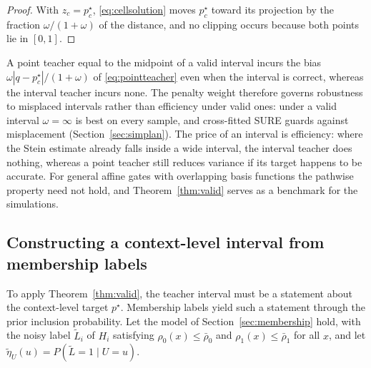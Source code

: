 \documentclass[11pt]{article}
\theoremstyle{plain}
\theoremstyle{definition}
\theoremstyle{remark}
\begin{document}
\begin{proof}
With $z_c=p_c^\star$, \eqref{eq:cellsolution} moves $p_c^\star$ toward its projection by the
fraction $\omega/(1+\omega)$ of the distance, and no clipping occurs because both points
lie in $[0,1]$.
\end{proof}

A point teacher equal to the midpoint of a valid interval incurs the bias
$\omega|q-p^\star_c|/(1+\omega)$ of \eqref{eq:pointteacher} even when the interval is
correct, whereas the interval teacher incurs none. The penalty weight therefore governs
robustness to misplaced intervals rather than efficiency under valid ones: under a valid
interval $\omega=\infty$ is best on every sample, and cross-fitted SURE guards against
misplacement (Section~\ref{sec:simplan}). The price of an interval is efficiency: where the
Stein estimate already falls inside a wide interval, the interval teacher does nothing, whereas
a point teacher still reduces variance if its target happens to be accurate. For general affine gates with overlapping
basis functions the pathwise property need not hold, and Theorem~\ref{thm:valid} serves as
a benchmark for the simulations.

\subsection{Constructing a context-level interval from membership labels}\label{sec:construct}

To apply Theorem~\ref{thm:valid}, the teacher interval must be a statement about the
context-level target $p^\star$. Membership labels yield such a statement through the prior
inclusion probability. Let the model of Section~\ref{sec:membership} hold, with the noisy
label $\widetilde L_i$ of $H_i$ satisfying $\rho_0(x)\le\bar\rho_0$ and $\rho_1(x)\le
\bar\rho_1$ for all $x$, and let $\widetilde\eta_U(u)=P(\widetilde L=1\mid U=u)$.
\end{document}
